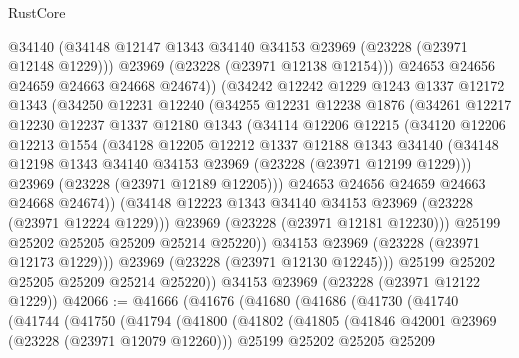 \begin{lexlean}{RustCore}
\begin{coremodule}
                @34140
                (@34148 @12147 @1343 @34140 @34153 @23969 (@23228 (@23971 @12148 @1229)))
                @23969
                (@23228 (@23971 @12138 @12154)))
              @24653
              @24656
              @24659
              @24663
              @24668
              @24674))
          (@34242
            @12242
            @1229
            @1243
            @1337
            @12172
            @1343
            (@34250
              @12231
              @12240
              (@34255
                @12231
                @12238
                @1876
                (@34261
                  @12217
                  @12230
                  @12237
                  @1337
                  @12180
                  @1343
                  (@34114
                    @12206
                    @12215
                    (@34120
                      @12206
                      @12213
                      @1554
                      (@34128
                        @12205
                        @12212
                        @1337
                        @12188
                        @1343
                        @34140
                        (@34148 @12198 @1343 @34140 @34153 @23969 (@23228 (@23971 @12199 @1229)))
                        @23969
                        (@23228 (@23971 @12189 @12205)))
                      @24653
                      @24656
                      @24659
                      @24663
                      @24668
                      @24674))
                  (@34148 @12223 @1343 @34140 @34153 @23969 (@23228 (@23971 @12224 @1229)))
                  @23969
                  (@23228 (@23971 @12181 @12230)))
                @25199
                @25202
                @25205
                @25209
                @25214
                @25220))
            @34153
            @23969
            (@23228 (@23971 @12173 @1229)))
          @23969
          (@23228 (@23971 @12130 @12245)))
        @25199
        @25202
        @25205
        @25209
        @25214
        @25220))
    @34153
    @23969
    (@23228 (@23971 @12122 @1229))
@42066 := @41666
    (@41676
      (@41680
        (@41686
          (@41730
            (@41740
              (@41744
                (@41750
                  (@41794
                    (@41800
                      (@41802
                        (@41805
                          (@41846 @42001 @23969 (@23228 (@23971 @12079 @12260)))
                          @25199
                          @25202
                          @25205
                          @25209

\end{coremodule}
\end{lexlean}
